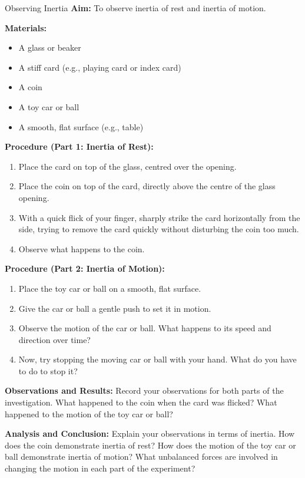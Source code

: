 \begin{investigation}{Observing Inertia}
\textbf{Aim:} To observe inertia of rest and inertia of motion.

\textbf{Materials:}
\begin{itemize}
    \item A glass or beaker
    \item A stiff card (e.g., playing card or index card)
    \item A coin
    \item A toy car or ball
    \item A smooth, flat surface (e.g., table)
\end{itemize}

\textbf{Procedure (Part 1: Inertia of Rest):}
\begin{enumerate}
    \item Place the card on top of the glass, centred over the opening.
    \item Place the coin on top of the card, directly above the centre of the glass opening.
    \item With a quick flick of your finger, sharply strike the card horizontally from the side, trying to remove the card quickly without disturbing the coin too much.
    \item Observe what happens to the coin.
\end{enumerate}

\textbf{Procedure (Part 2: Inertia of Motion):}
\begin{enumerate}
    \item Place the toy car or ball on a smooth, flat surface.
    \item Give the car or ball a gentle push to set it in motion.
    \item Observe the motion of the car or ball. What happens to its speed and direction over time?
    \item Now, try stopping the moving car or ball with your hand. What do you have to do to stop it?
\end{enumerate}

\textbf{Observations and Results:}
Record your observations for both parts of the investigation. What happened to the coin when the card was flicked? What happened to the motion of the toy car or ball?

\textbf{Analysis and Conclusion:}
Explain your observations in terms of inertia.  How does the coin demonstrate inertia of rest? How does the motion of the toy car or ball demonstrate inertia of motion?  What unbalanced forces are involved in changing the motion in each part of the experiment?

\end{investigation}

